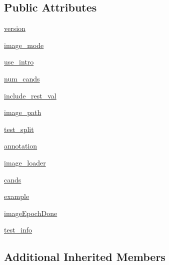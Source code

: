 \subsection*{Public Attributes}
\begin{DoxyCompactItemize}
\item 
\hyperlink{classparlai_1_1tasks_1_1coco__caption_1_1agents_1_1DefaultTeacher_a5945ea0eff083c797fa85d1174c1a2e3}{version}
\item 
\hyperlink{classparlai_1_1tasks_1_1coco__caption_1_1agents_1_1DefaultTeacher_a9b0ff4c5a830f5b5028ae5f9bb53b62c}{image\+\_\+mode}
\item 
\hyperlink{classparlai_1_1tasks_1_1coco__caption_1_1agents_1_1DefaultTeacher_af192ad177d4f90981d27f42fcfcc74d2}{use\+\_\+intro}
\item 
\hyperlink{classparlai_1_1tasks_1_1coco__caption_1_1agents_1_1DefaultTeacher_adced235f1df6c466781732208a03fcc0}{num\+\_\+cands}
\item 
\hyperlink{classparlai_1_1tasks_1_1coco__caption_1_1agents_1_1DefaultTeacher_ae6cae72726e88cd2f64ff60e0bad43fe}{include\+\_\+rest\+\_\+val}
\item 
\hyperlink{classparlai_1_1tasks_1_1coco__caption_1_1agents_1_1DefaultTeacher_afc29d1b2c83ba32ca3fe553c02c873b9}{image\+\_\+path}
\item 
\hyperlink{classparlai_1_1tasks_1_1coco__caption_1_1agents_1_1DefaultTeacher_a20df5fdbe570fb77c5ed9a581e3287ae}{test\+\_\+split}
\item 
\hyperlink{classparlai_1_1tasks_1_1coco__caption_1_1agents_1_1DefaultTeacher_ad9f53dc5f0ebf3ef0fbd6755f060d533}{annotation}
\item 
\hyperlink{classparlai_1_1tasks_1_1coco__caption_1_1agents_1_1DefaultTeacher_a596bf56d444a2182ee157744449e86c2}{image\+\_\+loader}
\item 
\hyperlink{classparlai_1_1tasks_1_1coco__caption_1_1agents_1_1DefaultTeacher_ab3bd0ce49d1e657108577a9777070459}{cands}
\item 
\hyperlink{classparlai_1_1tasks_1_1coco__caption_1_1agents_1_1DefaultTeacher_a05dd82fff16bdd43926056ab15052d98}{example}
\item 
\hyperlink{classparlai_1_1tasks_1_1coco__caption_1_1agents_1_1DefaultTeacher_aa076239254e4754bf6a2753238716f49}{image\+Epoch\+Done}
\item 
\hyperlink{classparlai_1_1tasks_1_1coco__caption_1_1agents_1_1DefaultTeacher_adddb430015e2e7e49376d812acc36fa8}{test\+\_\+info}
\end{DoxyCompactItemize}
\subsection*{Additional Inherited Members}


